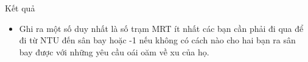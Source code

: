 Kết quả
\begin{itemize}
	\item     Ghi ra một số duy nhất là         số trạm MRT ít nhất        các bạn cần phải đi qua để đi từ NTU đến sân bay hoặc -1 nếu không có cách nào cho hai bạn ra sân bay được với những yêu cầu oái oăm về xu của họ.   
\end{itemize}